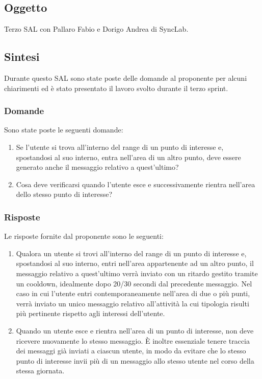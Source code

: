 \documentclass[10pt]{article}
\begin{document}
\subsection{Oggetto}
Terzo SAL con Pallaro Fabio e Dorigo Andrea di SyncLab.

\subsection{Sintesi}
Durante questo SAL sono state poste delle domande al proponente per alcuni chiarimenti ed è stato presentato il lavoro svolto durante il terzo sprint.

    \subsubsection{Domande}
    Sono state poste le seguenti domande:
    \begin{enumerate}
        \item Se l'utente si trova all'interno del range di un punto di interesse e, spostandosi al suo interno, entra nell'area di un altro punto, deve essere generato anche il messaggio relativo a quest'ultimo?
        \item Cosa deve verificarsi quando l'utente esce e successivamente rientra nell'area dello stesso punto di interesse?
    \end{enumerate}

    \subsubsection{Risposte}
    Le risposte fornite dal proponente sono le seguenti:
    \begin{enumerate}
        \item Qualora un utente si trovi all'interno del range di un punto di interesse e, spostandosi al suo interno, entri nell'area appartenente ad un altro punto, il messaggio relativo a quest'ultimo verrà inviato con un ritardo gestito tramite un cooldown, idealmente dopo 20/30 secondi dal precedente messaggio. Nel caso in cui l'utente entri contemporaneamente nell'area di due o più punti, verrà inviato un unico messaggio relativo all'attività la cui tipologia risulti più pertinente rispetto agli interessi dell'utente.
        \item Quando un utente esce e rientra nell'area di un punto di interesse, non deve ricevere nuovamente lo stesso messaggio. È inoltre essenziale tenere traccia dei messaggi già inviati a ciascun utente, in modo da evitare che lo stesso punto di interesse invii più di un messaggio allo stesso utente nel corso della stessa giornata.
    \end{enumerate}
\end{document}
